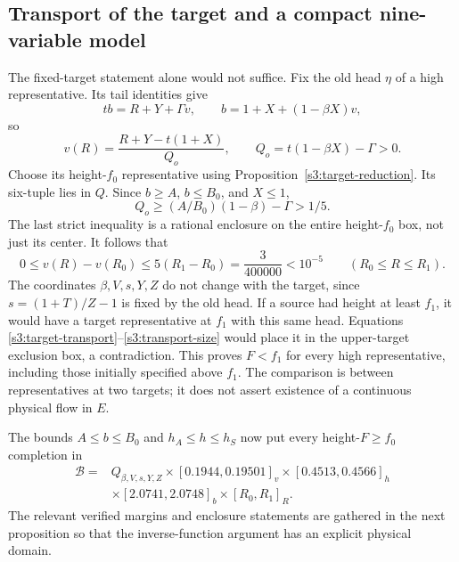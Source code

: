 \documentclass[11pt,reqno]{amsart}
\theoremstyle{definition}
\theoremstyle{remark}
\begin{document}
\subsection{Transport of the target and a compact nine-variable model}
\label{s3:transport-section}

The fixed-target statement alone would not suffice. Fix the old head
\(\eta\) of a high representative. Its tail identities give
\[
 tb=R+Y+\Gamma v,\qquad b=1+X+(1-\beta X)v,
\]
so
\begin{equation}\label{s3:target-transport}
 v(R)=\frac{R+Y-t(1+X)}{Q_o},\qquad
 Q_o=t(1-\beta X)-\Gamma>0.
\end{equation}
Choose its height-\(f_0\) representative using
Proposition~\ref{s3:target-reduction}. Its six-tuple lies in \(Q\).
Since \(b\ge A\), \(b\le B_0\), and \(X\le1\),
\[
 Q_o\ge (A/B_0)(1-\beta)-\Gamma>1/5.
\]
The last strict inequality is a rational enclosure on the entire
height-\(f_0\) box, not just its center. It follows that
\begin{equation}\label{s3:transport-size}
 0\le v(R)-v(R_0)
 \le5(R_1-R_0)=\frac3{400000}<10^{-5}
 \qquad (R_0\le R\le R_1).
\end{equation}
The coordinates \(\beta,V,s,Y,Z\) do not change with the target,
since \(s=(1+T)/Z-1\) is fixed by the old head.
If a source had height at least \(f_1\), it would have a target
representative at \(f_1\) with this same head. Equations
\eqref{s3:target-transport}--\eqref{s3:transport-size} would place it
in the upper-target exclusion box, a contradiction. This proves
\(F<f_1\) for every high representative, including those initially
specified above \(f_1\).
The comparison is between representatives at two targets; it does
not assert existence of a continuous physical flow in \(E\).

The bounds \(A\le b\le B_0\) and \(h_A\le h\le h_S\)
now put every height-\(F\ge f_0\) completion in
\begin{equation}\label{s3:nine-box}
\begin{split}
 \mathcal B={}&Q_{\beta,V,s,Y,Z}
 \times[0.1944,0.19501]_v\times[0.4513,0.4566]_h\\
 &\times[2.0741,2.0748]_b\times[R_0,R_1]_R.
\end{split}
\end{equation}
The relevant verified margins and enclosure statements are gathered
in the next proposition so that the inverse-function argument has
an explicit physical domain.
\end{document}

